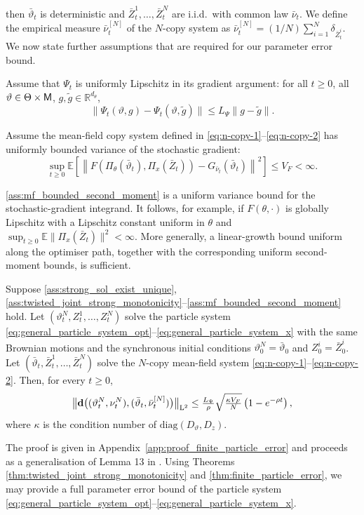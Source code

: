 then \(\bar\vartheta_t\) is deterministic and
\(\bar Z_t^1,\ldots,\bar Z_t^N\) are i.i.d.\ with common law \(\bar\nu_t\). We define the empirical measure $\bar\nu_t^{[N]}$ of the $N$-copy system as $\bar\nu_t^{[N]}=({1}/{N})\sum_{i=1}^N\delta_{\bar Z_t^i}$. We now state further assumptions that are required for our parameter error bound.
\begin{assumption}\label{ass:psi_F_lipschitz}
Assume that $\Psi_t$ is uniformly Lipschitz in its gradient argument: for all
$t\ge0$, all $\vartheta\in\Theta\times\sM$,
$g,\tilde g\in\mathbb R^{d_\theta}$,
\[
    \|\Psi_t(\vartheta,g)-\Psi_t(\vartheta,\tilde g)\|
    \le
    L_\Psi\|g-\tilde g\|.
\]
\end{assumption}

\begin{assumption}\label{ass:mf_bounded_second_moment}
Assume the mean-field copy system defined in \eqref{eq:n-copy-1}--\eqref{eq:n-copy-2} has uniformly bounded variance of the stochastic gradient:
\[
    \sup_{t\ge0}
    \mathbb E
    \left[
    \left\|
    F(\Pi_\theta(\bar\vartheta_t),\Pi_x(\bar Z_t))
    -
    G_{\bar\nu_t}(\bar\vartheta_t)
    \right\|^2
    \right]
    \le
    V_F
    <
    \infty.
\]
\end{assumption}
{\color{red}\ref{ass:mf_bounded_second_moment}}
is a uniform variance bound for the stochastic-gradient integrand.  It follows,
for example, if \(F(\theta,\cdot)\) is globally Lipschitz with a Lipschitz
constant uniform in \(\theta\) and
\(\sup_{t\geq0}\mathbb E\|\Pi_x(\bar Z_t)\|^2<\infty\).  More generally, a
linear-growth bound uniform along the optimiser path, together with the corresponding uniform second-moment bounds, is sufficient.

\begin{theorem}
\label{thm:finite_particle_error}
Suppose \ref{ass:strong_sol_exist_unique}, \ref{ass:twisted_joint_strong_monotonicity}--\ref{ass:mf_bounded_second_moment} hold.
Let $(\vartheta_t^N,Z_t^1,\ldots,Z_t^N)$ solve the particle system
\eqref{eq:general_particle_system_opt}--\eqref{eq:general_particle_system_x}
with the same Brownian motions and the synchronous initial conditions
\(\vartheta_0^N=\bar\vartheta_0\) and \(Z_0^i=\bar Z_0^i\).
Let \((\bar\vartheta_t,\bar Z_t^1,\ldots,\bar Z_t^N)\) solve the \(N\)-copy mean-field system \eqref{eq:n-copy-1}--\eqref{eq:n-copy-2}. Then, for every
$t\ge0$,
\[
    \Ltwonorm[\big]{\mathbf{d}\big((\vartheta^N_t,\nu_t^N),(\bar\vartheta_t,\bar\nu_t^{[N]})\big)}
    \le
    \tfrac{L_\Psi}{\rho}
    \sqrt{\tfrac{\kappa V_F}{N}}
    \left(1-e^{-\rho t}\right),
\]
where $\kappa$ is the condition number of
$\mathrm{diag}(D_\vartheta,D_z)$.
\end{theorem}
The proof is given in Appendix~\ref{app:proof_finite_particle_error} and proceeds as a generalisation of Lemma 13 in \cite{pgd_theory}. Using Theorems \ref{thm:twisted_joint_strong_monotonicity} and \ref{thm:finite_particle_error}, we may provide a full parameter error bound of the particle system \eqref{eq:general_particle_system_opt}--\eqref{eq:general_particle_system_x}.

